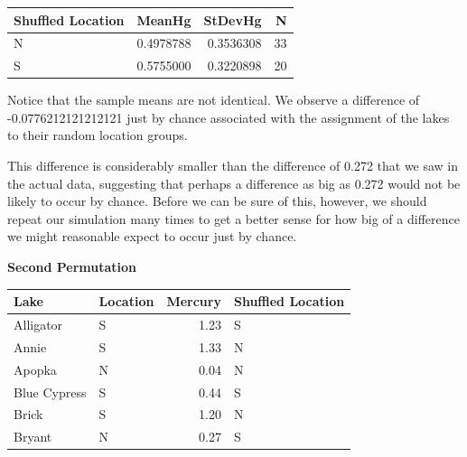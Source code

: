 \documentclass[
  letterpaper,
  DIV=11,
  numbers=noendperiod]{scrreprt}
\newenvironment{Shaded}{\begin{snugshade}}{\end{snugshade}}
\newcommand{\DecValTok}[1]{\textcolor[rgb]{0.68,0.00,0.00}{#1}}
\newcommand{\DocumentationTok}[1]{\textcolor[rgb]{0.37,0.37,0.37}{\textit{#1}}}
\newcommand{\FunctionTok}[1]{\textcolor[rgb]{0.28,0.35,0.67}{#1}}
\newcommand{\NormalTok}[1]{\textcolor[rgb]{0.00,0.23,0.31}{#1}}
\newcommand{\OtherTok}[1]{\textcolor[rgb]{0.00,0.23,0.31}{#1}}
\newcommand{\SpecialCharTok}[1]{\textcolor[rgb]{0.37,0.37,0.37}{#1}}
\begin{document}
\begin{longtable}[]{@{}lrrr@{}}
\toprule\noalign{}
Shuffled Location & MeanHg & StDevHg & N \\
\midrule\noalign{}
\endhead
\bottomrule\noalign{}
\endlastfoot
N & 0.4978788 & 0.3536308 & 33 \\
S & 0.5755000 & 0.3220898 & 20 \\
\end{longtable}

Notice that the sample means are not identical. We observe a difference
of -0.0776212121212121 just by chance associated with the assignment of
the lakes to their random location groups.

This difference is considerably smaller than the difference of 0.272
that we saw in the actual data, suggesting that perhaps a difference as
big as 0.272 would not be likely to occur by chance. Before we can be
sure of this, however, we should repeat our simulation many times to get
a better sense for how big of a difference we might reasonable expect to
occur just by chance.

\textbf{Second Permutation}

\begin{Shaded}
\end{Shaded}

\begin{longtable}[]{@{}llrl@{}}
\toprule\noalign{}
Lake & Location & Mercury & Shuffled Location \\
\midrule\noalign{}
\endhead
\bottomrule\noalign{}
\endlastfoot
Alligator & S & 1.23 & S \\
Annie & S & 1.33 & N \\
Apopka & N & 0.04 & N \\
Blue Cypress & S & 0.44 & S \\
Brick & S & 1.20 & N \\
Bryant & N & 0.27 & S \\
\end{longtable}
\end{document}
